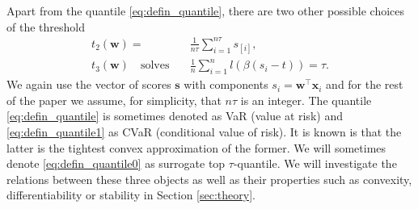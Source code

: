 \documentclass{Thesis}
\begin{document}
Apart from the quantile \eqref{eq:defin_quantile}, there are two other possible choices of the threshold
\begin{align}
  \label{eq:defin_quantile1} t_2(\bm{w}) =\ &\frac{1}{n\tau}\sum_{i=1}^{n\tau} s_{[i]}, \\
  \label{eq:defin_quantile0} t_3(\bm{w})\quad \text{solves} \quad & \frac{1}{n}\sum_{i = 1}^nl(\beta(s_i - t)) = \tau.
\end{align}
We again use the vector of scores $\bm{s}$ with components $s_i = \bm{w}^\top \bm{x}_i$ and for the rest of the paper we assume, for simplicity, that $n\tau$ is an integer. The quantile \eqref{eq:defin_quantile} is sometimes denoted as VaR (value at risk) and \eqref{eq:defin_quantile1} as CVaR (conditional value of risk). It is known is that the latter is the tightest convex approximation of the former. We will sometimes denote \eqref{eq:defin_quantile0} as surrogate top $\tau$-quantile. We will investigate the relations between these three objects as well as their properties such as convexity, differentiability or stability in Section \ref{sec:theory}.
\end{document}
